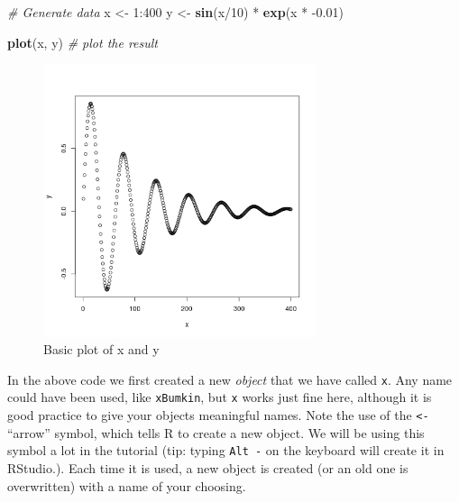 \documentclass[]{article}
\newenvironment{Shaded}{}{}
\newcommand{\KeywordTok}[1]{\textcolor[rgb]{0.00,0.44,0.13}{\textbf{{#1}}}}
\newcommand{\DecValTok}[1]{\textcolor[rgb]{0.25,0.63,0.44}{{#1}}}
\newcommand{\FloatTok}[1]{\textcolor[rgb]{0.25,0.63,0.44}{{#1}}}
\newcommand{\CommentTok}[1]{\textcolor[rgb]{0.38,0.63,0.69}{\textit{{#1}}}}
\newcommand{\NormalTok}[1]{{#1}}
\let\Oldincludegraphics\includegraphics
\renewcommand{\includegraphics}[1]{\Oldincludegraphics[width=8cm]{#1}}
\begin{document}
\begin{Shaded}
\begin{Highlighting}[]
\CommentTok{# Generate data}
\NormalTok{x <- }\DecValTok{1}\NormalTok{:}\DecValTok{400}
\NormalTok{y <- }\KeywordTok{sin}\NormalTok{(x/}\DecValTok{10}\NormalTok{) * }\KeywordTok{exp}\NormalTok{(x * -}\FloatTok{0.01}\NormalTok{)}

\KeywordTok{plot}\NormalTok{(x, y)  }\CommentTok{# plot the result}
\end{Highlighting}
\end{Shaded}
\begin{figure}[htbp]
\centering
\includegraphics{figure/Basic_plot_of_x_and_y.png}
\caption{Basic plot of x and y}
\end{figure}

In the above code we first created a new \emph{object} that we have
called \texttt{x}. Any name could have been used, like \texttt{xBumkin},
but \texttt{x} works just fine here, although it is good practice to
give your objects meaningful names. Note the use of the
\texttt{\textless{}-} ``arrow'' symbol, which tells R to create a new
object. We will be using this symbol a lot in the tutorial (tip: typing
\texttt{Alt -} on the keyboard will create it in RStudio.). Each time it
is used, a new object is created (or an old one is overwritten) with a
name of your choosing.
\end{document}

